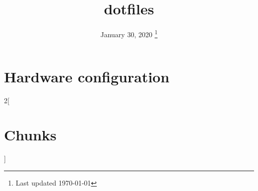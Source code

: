 \documentclass[a4paper,noglossary,titlepage,xelatex]{tufte-book}
\title{dotfiles}
\date{%
  January 30, 2020
  \thanks{Last updated \today}
}
\begin{document}
\frontmatter
\maketitle
\tableofcontents
\mainmatter

\newpage
\chapter{Hardware configuration}


\backmatter
\newpage
\begin{multicols}{2}[\chapter*{Chunks}]
  \nowebchunks
\end{multicols}






\newpage
\listoftodos[To-Do]
\end{document}
